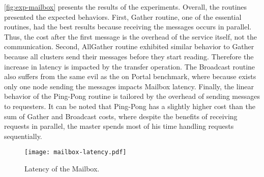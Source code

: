 		\autoref{fig:exp-mailbox} presents the results of the experiments.
		Overall, the routines presented the expected behaviors.
		First, Gather routine, one of the essential routines, had the best
		results because receiving the messages occurs in parallel. Thus,
		the cost after the first message is the overhead of the service
		itself, not the communication. Second, AllGather routine exhibited
		similar behavior to Gather because all clusters send their messages
		before they start reading. Therefore the increase in latency is
		impacted by the transfer operation. The Broadcast routine also
		suffers from the same evil as the on Portal benchmark, where because
		exists only one node sending the messages impacts Mailbox latency.
		Finally, the linear behavior of the Ping-Pong routine is tailored
		by the overhead of sending messages to requesters. It can be noted
		that Ping-Pong has a slightly higher cost than the sum of Gather
		and Broadcast costs, where despite the benefits of receiving
		requests in parallel, the master spends most of his time handling
		requests sequentially.



		\begin{figure}[!tb]
			\centering%
			\caption{Latency of the Mailbox.}%
			\label{fig:exp-mailbox}%
			\texttt{[image: mailbox-latency.pdf]}%
		\end{figure}
